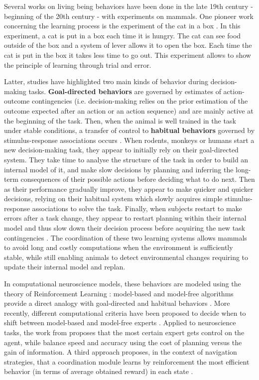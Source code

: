 \documentclass[english,a4paper,11pt,twoside]{StyleThese}
\begin{document}
Several works on living being behaviors have been done in the late 19th century - beginning of the 20th century - with experiments on mammals. One pioneer work concerning the learning process is the experiment of the cat in a box \cite{thorndike1911animal}. In this experiment, a cat is put in a box each time it is hungry. The cat can see food outside of the box and a system of lever allows it to open the box. Each time the cat is put in the box it takes less time to go out. This experiment allows to show the principle of learning through trial and error. 

Latter, studies have highlighted two main kinds of behavior during decision-making tasks. \textbf{Goal-directed behaviors} are governed by estimates of action-outcome contingencies (i.e. decision-making relies on the prior estimation of the outcome expected after an action or an action sequence) and are mainly active at the beginning of the task. Then, when the animal is well trained in the task under stable conditions, a transfer of control to \textbf{habitual behaviors} governed by stimulus-response associations occurs  \cite{dickinson1985actions}. When rodents, monkeys or humans start a new decision-making task, they appear to initially rely on their goal-directed system. They take time to analyse the structure of the task in order to build an internal model of it, and make slow decisions by planning and inferring the long-term consequences of their possible actions before deciding what to do next. Then as their performance gradually improve, they appear to make quicker and quicker decisions, relying on their habitual system which slowly acquires simple stimulus-response associations to solve the task. Finally, when subjects restart to make errors after a task change, they appear to restart planning within their internal model and thus slow down their decision process before acquiring the new task contingencies \cite{balleine2010human, dolan2013goals}. The coordination of these two learning systems allows mammals to avoid long and costly computations when the environment is sufficiently stable, while still enabling animals to detect environmental changes requiring to update their internal model and replan.

In computational neuroscience models, these behaviors are modeled using the theory of Reinforcement Learning \cite{sutton1998introduction}: model-based and model-free algorithms provide a direct analogy with goal-directed and habitual behaviors \cite{daw2005uncertainty}. More recently, different computational criteria have been proposed to decide when to shift between model-based and model-free experts \cite{pezzulo2013mixed, lesaint2014modelling, viejo2015modeling}. Applied to neuroscience tasks, the work from \cite{daw2005uncertainty} proposes that the most certain expert gets control on the agent, while \cite{keramati2011speed} balance speed and accuracy using the cost of planning versus the gain of information. A third approach proposes, in the context of navigation strategies, that a coordination module learns by reinforcement the most efficient behavior (in terms of average obtained reward) in each state \cite{dolle2010path}.
\end{document}
